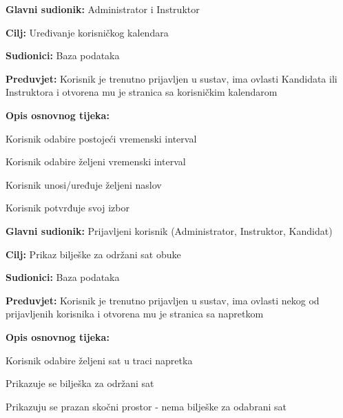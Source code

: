  \noindent {}
	\begin{packed_item}
		
		\item \textbf{Glavni sudionik:} Administrator i Instruktor
		\item  \textbf{Cilj:} Uređivanje  korisničkog kalendara 
		\item  \textbf{Sudionici:} Baza podataka
		\item  \textbf{Preduvjet:} Korisnik je trenutno prijavljen u sustav, ima ovlasti Kandidata ili Instruktora i otvorena mu je stranica sa korisničkim kalendarom
		\item  \textbf{Opis osnovnog tijeka:}
		
		\item[] \begin{packed_enum}
			
			\item[1.a] Korisnik odabire postojeći vremenski interval 
                \item[1.b] Korisnik odabire željeni vremenski interval 
			\item Korisnik unosi/uređuje željeni naslov
                \item Korisnik potvrđuje svoj izbor
			
		\end{packed_enum}
		
	\end{packed_item}


  \noindent {}
	\begin{packed_item}
		
		\item \textbf{Glavni sudionik:} Prijavljeni korisnik (Administrator, Instruktor, Kandidat)
		\item  \textbf{Cilj:} Prikaz bilješke za održani sat obuke
		\item  \textbf{Sudionici:} Baza podataka
		\item  \textbf{Preduvjet:} Korisnik je trenutno prijavljen u sustav, ima ovlasti nekog od prijavljenih korisnika i otvorena mu je stranica sa napretkom
		\item  \textbf{Opis osnovnog tijeka:}
		
		\item[] \begin{packed_enum}
			
			\item Korisnik odabire željeni sat u traci napretka 
                \item[2.a] Prikazuje se bilješka za održani sat
                \item[2.a] Prikazuju se prazan skočni prostor - nema bilješke za odabrani sat
			
		\end{packed_enum}
		
	\end{packed_item}

